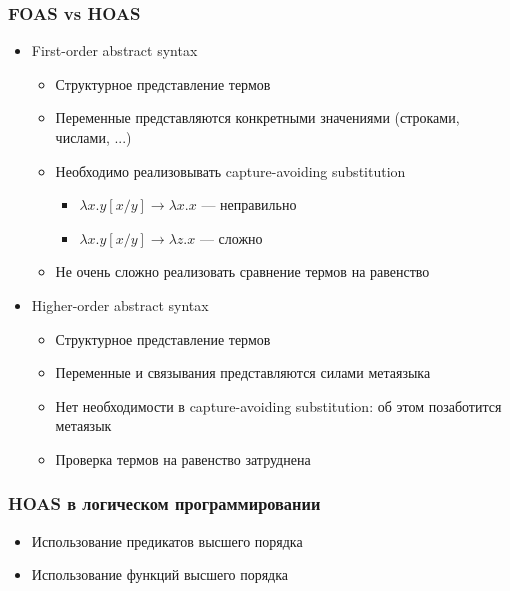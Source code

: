 \documentclass{beamer}
\begin{document}
\begin{frame}[fragile]
  \frametitle{FOAS vs HOAS}

  \begin{itemize}
    \item First-order abstract syntax
    \begin{itemize}
      \item Структурное представление термов
      \item Переменные представляются конкретными значениями (строками, числами, ...)
      \item Необходимо реализовывать capture-avoiding substitution
      \begin{itemize}
        \item $\lambda x. y [x / y] \to \lambda x. x$ --- неправильно
        \item $\lambda x. y [x / y] \to \lambda z. x$ --- сложно
      \end{itemize}
      \item Не очень сложно реализовать сравнение термов на равенство
    \end{itemize}
    \item Higher-order abstract syntax
    \begin{itemize}
      \item Структурное представление термов
      \item Переменные и связывания представляются силами метаязыка
      \item Нет необходимости в capture-avoiding substitution: об этом позаботится метаязык
      \item Проверка термов на равенство затруднена
    \end{itemize}
  \end{itemize}
\end{frame}

\begin{frame}
  \frametitle{HOAS в логическом программировании}
  \begin{itemize}
    \item Использование предикатов высшего порядка
    \item Использование функций высшего порядка
  \end{itemize}
\end{frame}
\end{document}
